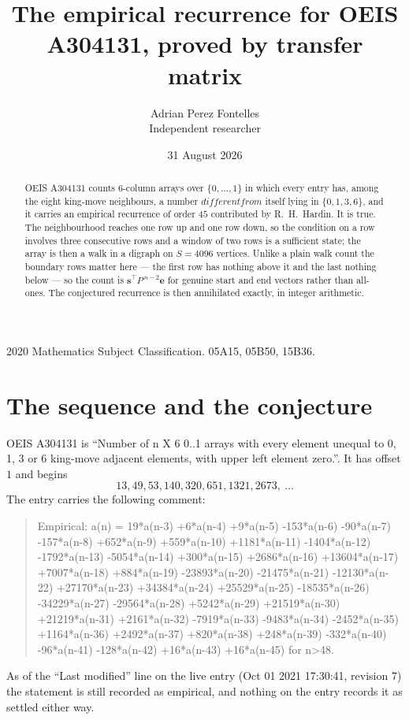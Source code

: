 \documentclass[11pt,a4paper]{article}
\title{The empirical recurrence for OEIS A304131, proved by transfer matrix}
\author{Adrian Perez Fontelles\\ \small Independent researcher}
\date{31 August 2026}
\theoremstyle{plain}
\theoremstyle{definition}
\begin{document}
\maketitle

\begin{abstract}
OEIS A304131 counts $6$-column arrays over $\{0,\dots,1\}$ in which every entry has,
among the eight king-move neighbours, a number $different from$ itself lying in $\{0,1,3,6\}$, and it carries an empirical
recurrence of order $45$ contributed by R.~H.~Hardin. It is true. The neighbourhood
reaches one row up and one row down, so the condition on a row involves three consecutive
rows and a window of two rows is a sufficient state; the array is then a walk in a digraph
on $S=4096$ vertices. Unlike a plain walk count the boundary rows matter here --- the first
row has nothing above it and the last nothing below --- so the count is
$\mathbf{s}^{\!\top}P^{\,n-2}\mathbf{e}$ for genuine start and end vectors rather than
all-ones. The conjectured recurrence is then annihilated exactly, in integer arithmetic.
\end{abstract}

\noindent\small 2020 Mathematics Subject Classification. 05A15, 05B50, 15B36.\normalsize

\section{The sequence and the conjecture}

OEIS A304131 is ``Number of n X 6 0..1 arrays with every element unequal to 0, 1, 3 or 6 king-move adjacent elements, with upper left element zero.''. It has offset
$1$ and begins
\[
13, 49, 53, 140, 320, 651, 1321, 2673,\ \dots
\]
The entry carries the following comment:
\begin{quote}\small
Empirical: a(n) = 19*a(n-3) +6*a(n-4) +9*a(n-5) -153*a(n-6) -90*a(n-7) -157*a(n-8) +652*a(n-9) +559*a(n-10) +1181*a(n-11) -1404*a(n-12) -1792*a(n-13) -5054*a(n-14) +300*a(n-15) +2686*a(n-16) +13604*a(n-17) +7007*a(n-18) +884*a(n-19) -23893*a(n-20) -21475*a(n-21) -12130*a(n-22) +27170*a(n-23) +34384*a(n-24) +25529*a(n-25) -18535*a(n-26) -34229*a(n-27) -29564*a(n-28) +5242*a(n-29) +21519*a(n-30) +21219*a(n-31) +2161*a(n-32) -7919*a(n-33) -9483*a(n-34) -2452*a(n-35) +1164*a(n-36) +2492*a(n-37) +820*a(n-38) +248*a(n-39) -332*a(n-40) -96*a(n-41) -128*a(n-42) +16*a(n-43) +16*a(n-45) for n>48.
\end{quote}
As of the ``Last modified'' line on the live entry (Oct 01 2021 17:30:41, revision
7) the statement is still recorded as empirical, and nothing on the entry
records it as settled either way.
\end{document}
